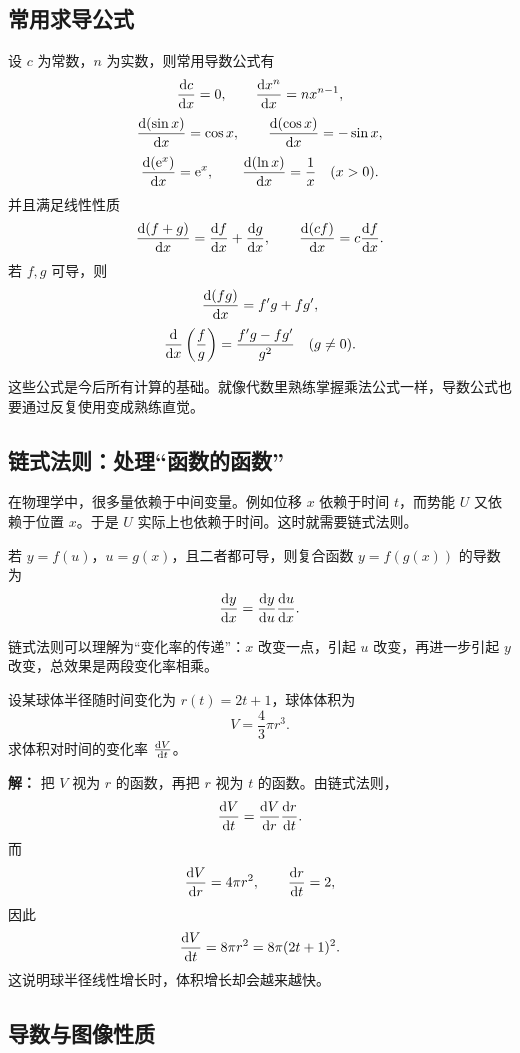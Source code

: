 \subsection{常用求导公式}

\begin{theorem}
设 $c$ 为常数，$n$ 为实数，则常用导数公式有
\[
  \dv{c}{x} = 0, \qquad \dv{x^n}{x} = nx^{n-1},
\]
\[
  \dv{(\sin x)}{x} = \cos x, \qquad \dv{(\cos x)}{x} = -\sin x,
\]
\[
  \dv{(\mathrm{e}^x)}{x} = \mathrm{e}^x, \qquad \dv{(\ln x)}{x} = \frac{1}{x} \quad (x>0).
\]
并且满足线性性质
\[
  \dv{(f+g)}{x} = \dv{f}{x} + \dv{g}{x},
  \qquad
  \dv{(cf)}{x} = c\dv{f}{x}.
\]
若 $f,g$ 可导，则
\[
  \dv{(fg)}{x} = f'g + fg',
\]
\[
  \dv{}{x}\left(\frac{f}{g}\right)=\frac{f'g-fg'}{g^2} \quad (g\ne 0).
\]
\end{theorem}

这些公式是今后所有计算的基础。就像代数里熟练掌握乘法公式一样，导数公式也要通过反复使用变成熟练直觉。

\subsection{链式法则：处理“函数的函数”}

在物理学中，很多量依赖于中间变量。例如位移 $x$ 依赖于时间 $t$，而势能 $U$ 又依赖于位置 $x$。于是 $U$ 实际上也依赖于时间。这时就需要链式法则。

\begin{theorem}[链式法则]
若 $y=f(u)$，$u=g(x)$，且二者都可导，则复合函数 $y=f(g(x))$ 的导数为
\[
  \dv{y}{x} = \dv{y}{u}\dv{u}{x}.
\]
\end{theorem}

链式法则可以理解为“变化率的传递”：$x$ 改变一点，引起 $u$ 改变，再进一步引起 $y$ 改变，总效果是两段变化率相乘。

\begin{example}
设某球体半径随时间变化为 $r(t)=2t+1$，球体体积为
\[
  V = \frac{4}{3}\pi r^3.
\]
求体积对时间的变化率 $\dv{V}{t}$。

\textbf{解：} 把 $V$ 视为 $r$ 的函数，再把 $r$ 视为 $t$ 的函数。由链式法则，
\[
  \dv{V}{t} = \dv{V}{r}\dv{r}{t}.
\]
而
\[
  \dv{V}{r} = 4\pi r^2, \qquad \dv{r}{t}=2,
\]
因此
\[
  \dv{V}{t} = 8\pi r^2 = 8\pi(2t+1)^2.
\]
这说明球半径线性增长时，体积增长却会越来越快。
\end{example}

\subsection{导数与图像性质}

